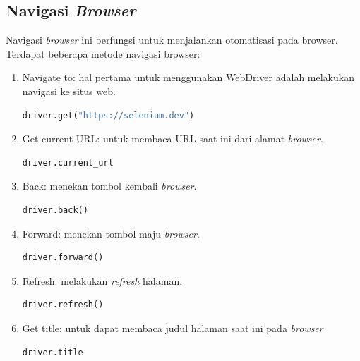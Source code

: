 \subsection{Navigasi \textit{Browser}}
Navigasi \textit{browser} ini berfungsi untuk menjalankan otomatisasi pada browser. Terdapat beberapa metode navigasi browser:
\begin{enumerate}
	\item Navigate to: hal pertama untuk menggunakan WebDriver adalah melakukan navigasi ke situs web.
	\begin{lstlisting}[language=python, caption=Contoh kode Navigate to, label=kode:2:navigate]
		driver.get("https://selenium.dev")
	\end{lstlisting}
	\item Get current URL: untuk membaca URL saat ini dari alamat \textit{browser}.
	\begin{lstlisting}[language=python, caption=Contoh kode Get current URL, label=kode:2:current]
		driver.current_url
	\end{lstlisting}
	\item Back: menekan tombol kembali \textit{browser}.
	\begin{lstlisting}[language=python, caption=Contoh kode Back, label=kode:2:back]
		driver.back()
	\end{lstlisting}
	\item Forward: menekan tombol maju \textit{browser}.
	\begin{lstlisting}[language=python, caption=Contoh kode Forward, label=kode:2:forward]
		driver.forward()
	\end{lstlisting}
	\item Refresh: melakukan \textit{refresh} halaman.
	\begin{lstlisting}[language=python, caption=Contoh kode Refresh, label=kode:2:refresh]
		driver.refresh()
	\end{lstlisting}
	\item Get title: untuk dapat membaca judul halaman saat ini pada \textit{browser}
	\begin{lstlisting}[language=python, caption=Contoh kode Get title, label=kode:2:title]
		driver.title
	\end{lstlisting}
\end{enumerate}



